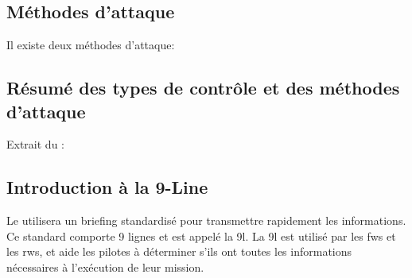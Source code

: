 \subsection{Méthodes d'attaque}
\e
	\item
	Il existe deux méthodes d'attaque:
	\ee
		\vskip5mm
	\ed
\ed

\subsection{Résumé des types de contrôle et des méthodes d'attaque}
\e
	\item
	Extrait du \jp: \\
	\vskip2mm
\ed

\subsection{Introduction à la 9-Line}

Le \ja{} utilisera un briefing standardisé pour transmettre rapidement les informations. Ce standard comporte 9 lignes et est appelé la \gls{9l}. La \gls{9l} est utilisé par les \glspl{fw} et les \glspl{rw}, et aide les pilotes à déterminer s'ils ont toutes les informations nécessaires à l'exécution de leur mission.


